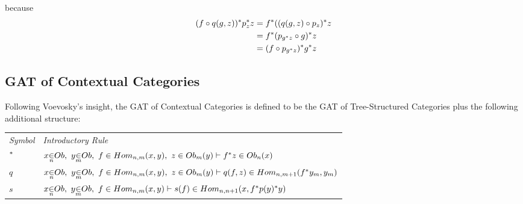 \documentclass[10pt,a4paper]{article}
\begin{document}
because
\begin{align*}
(f \circ q(g,z) ) ^* p_z ^* z 
                 & = f ^* ((q(g,z) \circ p_z) ^* z \\
                 & = f ^* ( p_{g ^* z} \circ g ) ^* z\\
                 & = (f \circ   p_{g ^* z} ) ^*  g ^* z
\end{align*}

\subsection{GAT of Contextual Categories}

\noindent Following Voevosky's insight, the GAT of Contextual Categories is defined to be the GAT of Tree-Structured Categories plus
the following additional structure: \\
\vspace{0.1cm} 
\begin{tabular}{>{\itshape}l l}
Symbol & \itshape{Introductory Rule} \\[0.1cm]
$^* $&$ \ofObi{x}{n} ,\  \ofObi{y}{m} ,\  \ofHomij{f}{n}{m}{x}{y} ,\  \ofT{z}{\Obi{m}(y)}
\tstyle \ofT {f \sub z}{\Obi{n}(x) } $\\[0.25cm]
$ q  $&$ \ofObi{x}{n} ,\  \ofObi{y}{m} ,\  \ofHomij{f}{n}{m}{x}{y} ,\  \ofT{z}{\Obi{m}(y)}
\tstyle
                     \ofT{q(f,z)}{  \Homij{n}{m+1}(f\sub y_m  , y_m ) }$  \\ [0.25cm]
$ s  $ & $ \ofObi{x}{n} ,\  \ofObi{y}{m} ,\  \ofHomij{f}{n}{m}{x}{y} \tstyle
                 \ofT{s(f)} {\Homij{n}{n+1}(x,f \sub p (y)  \sub y)} $ \\ [0.25cm]


\end{tabular} \\
\vspace{.1cm}  \\
\vspace{.03cm} \\
\end{document}
